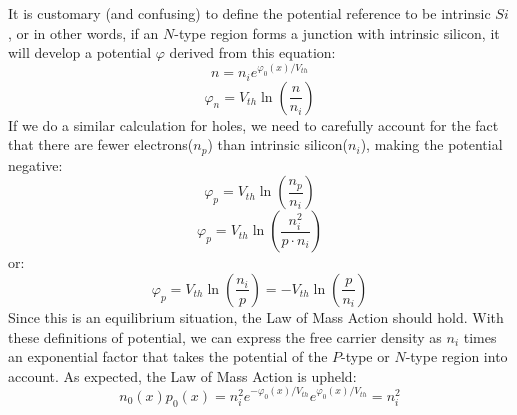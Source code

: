 It is customary (and confusing) to define the potential reference to be intrinsic $Si$, or in other words, if an $N$-type region forms a junction with intrinsic silicon, it will develop a potential $\varphi$ derived from this equation:
    \begin{equation} 
        n = n_ie^{\varphi_0(x)/V_{th}}
    \end{equation}
    \begin{equation} 
        \varphi_n = V_{th} \ln\left( \frac{n}{n_i} \right)
    \end{equation}
If we do a similar calculation for holes, we need to carefully account for the fact that there are fewer electrons($n_p$) than intrinsic silicon($n_i$), making the potential negative:
    \begin{equation} 
        \varphi_p = V_{th} \ln\left( \frac{n_p}{n_i}  \right)
    \end{equation}
    \begin{equation} 
        \varphi_p = V_{th} \ln\left( \frac{n_i^2}{p \cdot n_i}  \right)
    \end{equation}
or:
    \begin{equation} 
        \varphi_p = V_{th} \ln\left( \frac{n_i}{p}  \right) = - V_{th} \ln\left( \frac{p}{n_i}  \right) 
    \end{equation}
Since this is an equilibrium situation, the Law of Mass Action should hold.  With these definitions of potential, we can express the free carrier density as $n_i$ times an exponential factor that takes the potential of the $P$-type or $N$-type region into account.  As expected, the Law of Mass Action is upheld:
    \begin{equation} 
        {n_0}(x){p_0}(x) = n_i^2{e^{ - {\varphi _0}(x)/{V_{th}}}}{e^{{\varphi _0}(x)/{V_{th}}}} = n_i^2 
    \end{equation}
